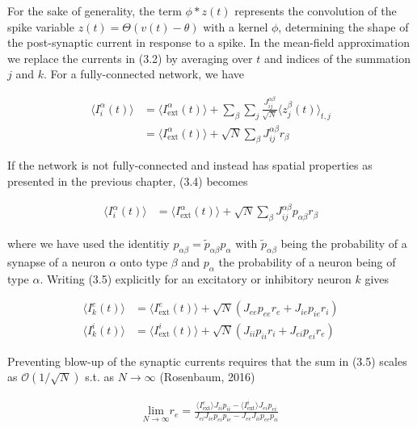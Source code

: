 \documentclass{ucetd}
\begin{document}
For the sake of generality, the term $\phi * z(t)$ represents the convolution of the spike variable $z(t) = \Theta(v(t) - \theta)$ with a kernel $\phi$, determining the shape of the post-synaptic current in response to a spike. In the mean-field approximation we replace the currents in (3.2) by averaging over $t$ and indices of the summation $j$ and $k$. For a fully-connected network, we have

\begin{align}
\langle I_{i}^{\alpha}(t)\rangle &= \langle I_{\mathrm{ext}}^{\alpha}(t)\rangle + \sum_{\beta}\sum_{j} \frac{J_{ij}^{\alpha\beta}}{\sqrt{N}}\langle z_{j}^{\beta}(t)\rangle_{t,j}\\
&= \langle I_{\mathrm{ext}}^{\alpha}(t)\rangle + \sqrt{N}\sum_{\beta}J_{ij}^{\alpha\beta} r_{\beta}
\end{align}

If the network is not fully-connected and instead has spatial properties as presented in the previous chapter, (3.4) becomes

\begin{align}
\langle I_{i}^{\alpha}(t)\rangle &= \langle I_{\mathrm{ext}}^{\alpha}(t)\rangle + \sqrt{N}\sum_{\beta}J_{ij}^{\alpha\beta}p_{\alpha\beta}r_{\beta}
\end{align}

where we have used the identitiy $p_{\alpha\beta} = \tilde{p}_{\alpha\beta}p_{\alpha}$ with $\tilde{p}_{\alpha\beta}$ being the probability of a synapse of a neuron $\alpha$ onto type $\beta$ and $p_{\alpha}$ the probability of a neuron being of type $\alpha$. Writing (3.5) explicitly for an excitatory or inhibitory neuron $k$ gives

\begin{align}
\langle I_{k}^{e}(t)\rangle &= \langle I_{\mathrm{ext}}^{e}(t)\rangle + \sqrt{N}\left(J_{ee}p_{ee}r_{e} + J_{ie}p_{ie}r_{i}\right)\\
\langle I_{k}^{i}(t)\rangle &= \langle I_{\mathrm{ext}}^{i}(t)\rangle + \sqrt{N}\left(J_{ii}p_{ii}r_{i} + J_{ei}p_{ei}r_{e}\right)
\end{align}


Preventing blow-up of the synaptic currents requires that the sum in (3.5) scales as $\mathcal{O}\left(1/\sqrt{N}\right)$ s.t. as $N\rightarrow \infty$ (Rosenbaum, 2016)

\begin{align}
\underset{N\rightarrow \infty}{\mathrm{lim}}r_{e} = \frac{\langle I_{\mathrm{ext}}^{e}\rangle J_{ii}p_{ii} - \langle I_{\mathrm{ext}}^{i}\rangle J_{ei}p_{ei}}{J_{ei}J_{ie}p_{ei}p_{ie} - J_{ee}J_{ii}p_{ee}p_{ii}}
\end{align}
\end{document}
